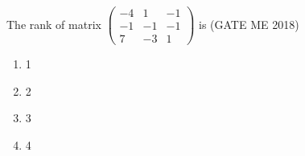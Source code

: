 \item The rank of matrix 
$\begin{pmatrix}
-4 & 1 & -1 \\
-1 & -1 & -1 \\
7 & -3 & 1
\end{pmatrix}
$
is  \hfill{(GATE ME 2018)}
\begin{multicols}{4}
\begin{enumerate}
      \item 1
     \item 2
     \item 3
     \item 4
    \end{enumerate}
\end{multicols}


